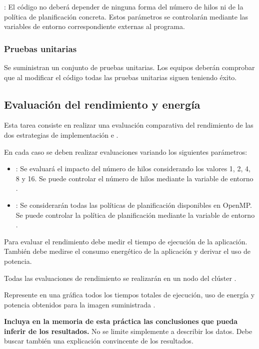 : El código no deberá depender de ninguna forma del 
número de hilos ni de la política de planificación concreta. Estos parámetros
se controlarán mediante las variables de entorno correspondiente externas
al programa.

\subsubsection{Pruebas unitarias}

Se suministran un conjunto de pruebas unitarias. Los equipos deberán comprobar
que al modificar el código todas las pruebas unitarias siguen teniendo éxito.

\subsection{Evaluación del rendimiento y energía}

Esta tarea consiste en realizar una evaluación comparativa del rendimiento
de las dos estrategias de implementación  e .

En cada caso se deben realizar evaluaciones variando los siguientes parámetros:
\begin{itemize}
  \item {}: Se evaluará el impacto del número de hilos
        considerando los valores 1, 2, 4, 8 y 16. Se puede controlar el número de hilos
        mediante la variable de entorno .

  \item {}: Se considerarán todas las
        políticas de planificación disponibles en OpenMP. Se puede controlar
        la política de planificación mediante la variable de entorno 
        .
      
\end{itemize}

Para evaluar el rendimiento debe medir el tiempo de ejecución de la
aplicación. También debe medirse el consumo energético de la aplicación
y derivar el uso de potencia.

Todas las evaluaciones de rendimiento se realizarán en un nodo del
clúster .

Represente en una gráfica todos los tiempos totales de ejecución, uso de energía y potencia
obtenidos para la imagen suministrada .

\textbf{Incluya en la memoria de esta práctica las conclusiones que pueda inferir de los resultados.}
No se limite simplemente a describir los datos. Debe buscar también una
explicación convincente de los resultados.
